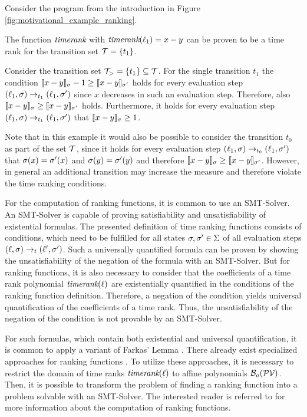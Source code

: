 \begin{example}
  Consider the program from the introduction in Figure \ref{fig:motivational_example_ranking}.
  
  The function $\emph{timerank}$ with $\emph{timerank}(\ell_1) = x-y$ can be proven to be a time rank for the transition set $\mathcal{T} = \lbrace t_1 \rbrace$.

  Consider the transition set $\mathcal{T}_> = \lbrace t_1 \rbrace \subseteq \mathcal{T}$.
  For the single transition $t_1$ the condition $\llbracket x-y \rrbracket_{\sigma} - 1 \geq \llbracket x-y \rrbracket_{\sigma'}$ holds for every evaluation step $(\ell_1,\sigma) \rightarrow_{t_1} (\ell_1,\sigma')$ since $x$ decreases in such an evaluation step.
  Therefore, also $\llbracket x-y \rrbracket_{\sigma} \geq \llbracket x-y \rrbracket_{\sigma'}$ holds.
  Furthermore, it holds for every evaluation step $(\ell_1,\sigma) \rightarrow_{t_1} (\ell_1,\sigma')$ that $\llbracket x-y \rrbracket_{\sigma} \geq 1$.

  Note that in this example it would also be possible to consider the transition $t_0$ as part of the set $\mathcal{T}$, since it holds for every evaluation step $(\ell_1,\sigma) \rightarrow_{t_0} (\ell_1,\sigma')$ that $\sigma(x)=\sigma'(x)$ and $\sigma(y)=\sigma'(y)$ and therefore $\llbracket x-y \rrbracket_{\sigma} \geq \llbracket x-y \rrbracket_{\sigma'}$.
  However, in general an additional transition may increase the measure and therefore violate the time ranking conditions.
\end{example}

For the computation of ranking functions, it is common to use an SMT-Solver.
An SMT-Solver is capable of proving satisfiability and unsatisfiability of existential formulas.
The presented definition of time ranking functions consists of conditions, which need to be fulfilled for all states $\sigma, \sigma' \in \Sigma$ of all evaluation steps $(\ell, \sigma) \rightarrow_t (\ell', \sigma')$.
Such a universally quantified formula can be proven by showing the unsatisfiability of the negation of the formula with an SMT-Solver.
But for ranking functions, it is also necessary to consider that the coefficients of a time rank polynomial $\emph{timerank}(\ell)$ are existentially quantified in the conditions of the ranking function definition.
Therefore, a negation of the condition yields universal quantification of the coefficients of a time rank.
Thus, the unsatisfiability of the negation of the condition is not provable by an SMT-Solver.

For such formulas, which contain both existential and universal quantification, it is common to apply a variant of Farkas' Lemma \cite{schrijver1998theory}.
There already exist specialized approaches for ranking functions \cite{bradley2005polyranking}.
To utilize these approaches, it is necessary to restrict the domain of time ranks $\emph{timerank}(\ell)$ to affine polynomials $\mathcal{B}_a(\mathcal{PV})$.
Then, it is possible to transform the problem of finding a ranking function into a problem solvable with an SMT-Solver.
The interested reader is referred to \cite{bradley2005polyranking} for more information about the computation of ranking functions.
